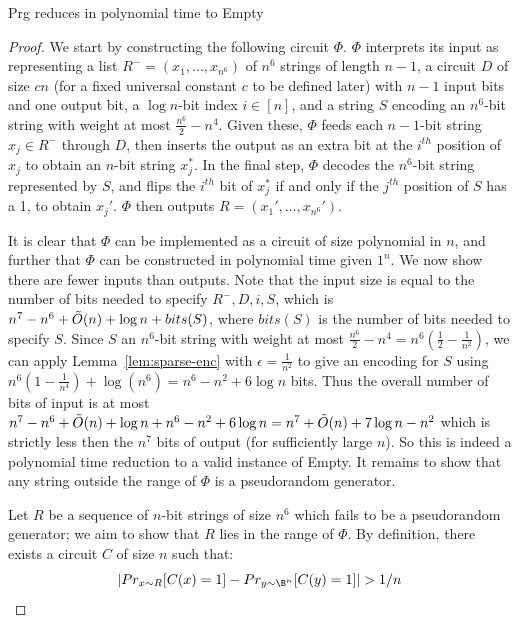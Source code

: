\begin{theorem}\label{thm:prg}
{\sc Prg} reduces in polynomial time to {\sc Empty}
\end{theorem}

\begin{proof}
We start by constructing the following circuit $\Phi$. $\Phi$ interprets its input as representing a list $R^- = (x_1, \ldots, x_{n^6})$ of $n^6$ strings of length $n-1$, a circuit $D$ of size $cn$ (for a fixed universal constant $c$ to be defined later) with $n-1$ input bits and one output bit, a $\log n$-bit index $i \in [n]$, and a string $S$ encoding an $n^6$-bit string with weight at most $\frac{n^6}{2} - n^4$. Given these, $\Phi$ feeds each $n-1$-bit string $x_j \in R^-$ through $D$, then inserts the output as an extra bit at the $i^{th}$ position of $x_j$ to obtain an $n$-bit string $x_j^*$. In the final step, $\Phi$ decodes the $n^6$-bit string represented by $S$, and flips the $i^{th}$ bit of $x_j^*$ if and only if the $j^{th}$ position of $S$ has a 1, to obtain $x_j'$. $\Phi$ then outputs $R = (x_1', \ldots, x_{n^6}')$.

It is clear that $\Phi$ can be implemented as a circuit of size polynomial in $n$, and further that $\Phi$ can be constructed in polynomial time given $1^n$. We now show there are fewer inputs than outputs. Note that the input size is equal to the number of bits needed to specify $R^-, D, i, S$, which is $n^7 - n^6 + \Tilde{O}(n) + \log n + bits(S)$, where $bits(S)$ is the number of bits needed to specify $S$. Since $S$ an $n^6$-bit string with weight at most $\frac{n^6}{2} - n^4 = n^6(\frac{1}{2} - \frac{1}{n^2})$, we can apply Lemma~\ref{lem:sparse-enc} with $\epsilon=\frac{1}{n^2}$ to give an encoding for $S$ using $n^6(1-\frac{1}{n^4}) + \log (n^6) = n^6 - n^2 + 6\log n$ bits. Thus the overall number of bits of input is at most $n^7 - n^6 + \Tilde{O}(n) + \log n + n^6 - n^2 + 6\log n = n^7 + \Tilde{O}(n) + 7\log n - n^2$ which is strictly less then the $n^7$ bits of output (for sufficiently large $n$). So this is indeed a polynomial time reduction to a valid instance of {\sc Empty}. It remains to show that any string outside the range of $\Phi$ is a pseudorandom generator.

Let $R$ be a sequence of $n$-bit strings of size $n^6$ which fails to be a pseudorandom generator; we aim to show that $R$ lies in the range of $\Phi$. By definition, there exists a circuit $C$ of size $n$ such that:
\[
|Pr_{x \sim R}[C(x)=1] - Pr_{y \sim \B^n}[C(y)=1]| > 1/n
\]


\end{proof}
